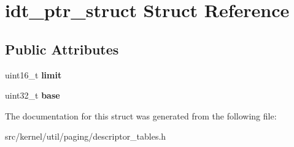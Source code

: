 \hypertarget{structidt__ptr__struct}{}\section{idt\+\_\+ptr\+\_\+struct Struct Reference}
\label{structidt__ptr__struct}
\subsection*{Public Attributes}
\begin{DoxyCompactItemize}
\item 
\mbox{\label{structidt__ptr__struct_a0401a63eb17ed7519442b1e828510acc}} 
uint16\+\_\+t {\bfseries limit}
\item 
\mbox{\label{structidt__ptr__struct_a1d3ba4d284df0cea7c7b2d1a22a7d9fb}} 
uint32\+\_\+t {\bfseries base}
\end{DoxyCompactItemize}


The documentation for this struct was generated from the following file\+:\begin{DoxyCompactItemize}
\item 
src/kernel/util/paging/descriptor\+\_\+tables.\+h\end{DoxyCompactItemize}
